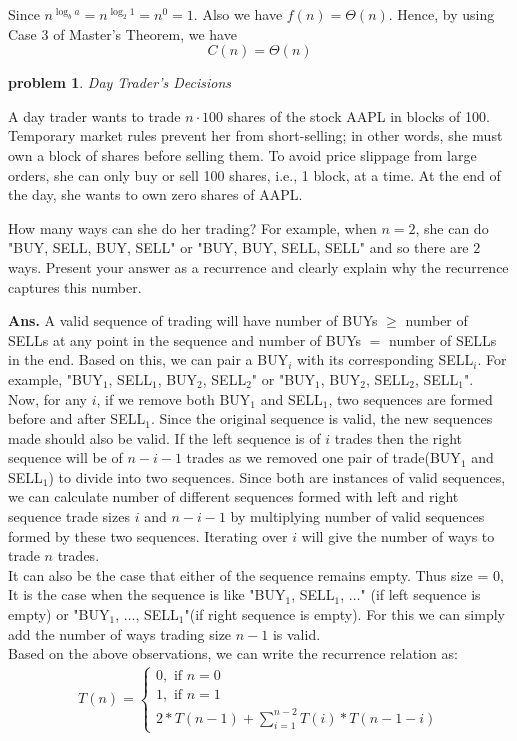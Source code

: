 \documentclass[11pt]{article}
\newtheorem{problem}{\sc\color{cit}problem}
\begin{document}
Since $n^{\log_b a} = n^{\log_{2} 1} = n^0 = 1$. Also we have $f(n) = \Theta(n)$. Hence, by using Case $3$ of Master's Theorem, we have
$$C(n) = \Theta(n)$$

\newpage
\begin{problem}{Day Trader's Decisions}\end{problem}
A day trader wants to trade $n\cdot 100$ shares of the stock AAPL in blocks of 100.  Temporary market rules prevent her from short-selling; in other words, she must own a block of shares before selling them.  To avoid price slippage from large orders, she can only buy or sell 100 shares, i.e., 1 block, at a time. At the end of the day, she wants to own zero shares of AAPL. 

How many ways can she do her trading?  For example, when $n=2$, she can do "BUY, SELL, BUY, SELL" or "BUY, BUY, SELL, SELL" and so there are $2$ ways. Present your answer as a recurrence and clearly explain why the recurrence captures this number.
\hfill

\noindent \textbf{Ans.} A valid sequence of trading will have number of BUYs $\geq$ number of SELLs at any point in the sequence and number of BUYs $=$ number of SELLs in the end. Based on this, we can pair a BUY$_i$ with its corresponding SELL$_i$. For example, "BUY$_1$, SELL$_1$, BUY$_2$, SELL$_2$" or "BUY$_1$, BUY$_2$, SELL$_2$, SELL$_1$".\\
Now, for any $i$, if we remove both BUY$_1$ and SELL$_1$, two sequences are formed before and after SELL$_1$. Since the original sequence is valid, the new sequences made should also be valid. If the left sequence is of $i$ trades then the right sequence will be of $n-i-1$ trades as we removed one pair of trade(BUY$_1$ and SELL$_1$) to divide into two sequences. Since both are instances of valid sequences, we can calculate number of different sequences formed with left and right sequence trade sizes $i$ and $n-i-1$ by multiplying number of valid sequences formed by these two sequences. Iterating over $i$ will give the number of ways to trade $n$ trades.\\
It can also be the case that either of the sequence remains empty. Thus size = $0$, It is the case when the sequence is like "BUY$_1$, SELL$_1$, $\ldots$" (if left sequence is empty) or "BUY$_1$, $\ldots$, SELL$_1$"(if right sequence is empty). For this we can simply add the number of ways trading size $n-1$ is valid.\\

Based on the above observations, we can write the recurrence relation as:
\begin{equation}
    \begin{split}
       T(n) = 
       \begin{cases}
            0, \text{ if } n=0\\
            1, \text{ if } n=1\\
            2*T(n-1)+\sum_{i=1}^{n-2}T(i)*T(n-1-i)
        \end{cases}
    \end{split}
\end{equation}
\newpage    
\end{document}
